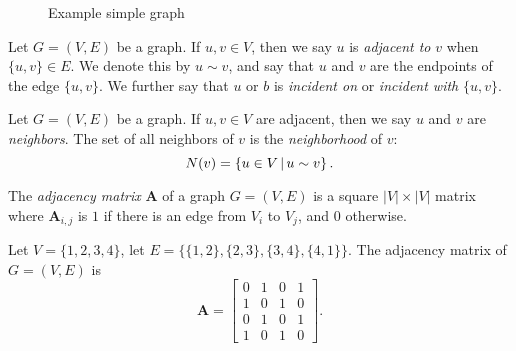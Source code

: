 \begin{figure}[ht!]
    \centering
\caption{Example simple graph}
\label{fig:example-simple-graph}
\end{figure}

\begin{defn}
    Let $G = (V, E)$ be a graph. If $u, v \in V$, then we say $u$ is \emph{adjacent to} $v$ when $\{u, v\} \in E$. We denote this by $u \sim v$, and say that $u$ and $v$ are the endpoints of the edge $\{u, v\}$. We further say that $u$ or $b$ is \emph{incident on} or \emph{incident with} $\{u, v\}$.
\end{defn}

\begin{defn}
    Let $G = (V, E)$ be a graph. If $u, v \in V$ are adjacent, then we say $u$ and $v$ are \emph{neighbors}. The set of all neighbors of $v$ is the \emph{neighborhood} of $v$:
    \[N(v) = \left\{u \in V \,\middle|\, u \sim v \right\}.\]
\end{defn}

\begin{defn}
    The \emph{adjacency matrix} $\bm{A}$ of a graph $G = (V, E)$ is a square $|V| \times |V|$ matrix where $\bm{A}_{i, j}$ is $1$ if there is an edge from $V_i$ to $V_j$, and $0$ otherwise.
\end{defn}

\begin{exmp}
    Let $V = \{1, 2, 3, 4\}$, let $E = \{\{1, 2\}, \{2, 3\}, \{3, 4\}, \{4, 1\}\}$. The adjacency matrix of $G = (V, E)$ is
    \[\bm{A} = \begin{bmatrix}
        0 & 1 & 0 & 1 \\
        1 & 0 & 1 & 0 \\
        0 & 1 & 0 & 1 \\
        1 & 0 & 1 & 0
    \end{bmatrix}.\]
\end{exmp}

